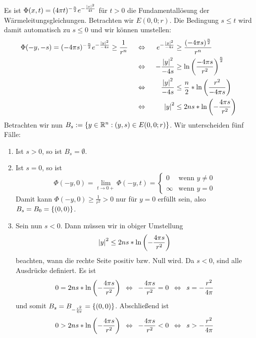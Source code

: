 \begin{exercisePage}
	Es ist $\Phi(x,t) = (4 \pi t)^{-\frac{n}{2}} e^{- \frac{\left| x \right|^2}{4t}}$ für $t>0$ die Fundamentallösung der Wärmeleitungsgleichungen. Betrachten wir $E(0,0;r)$. Die Bedingung $s \le t$ wird damit automatisch zu $s \le 0$ und wir können umstellen:
	\begin{align*}
		\Phi(-y,-s) = (-4 \pi s)^{-\frac{n}{2}} e^{- \frac{\left| y \right|^2}{-4s}} &\ge \frac{1}{r^n} 
		&\enskip \Leftrightarrow \enskip && e^{- \frac{\left| y \right|^2}{-4s}} &\ge \frac{(-4 \pi s)^{\frac{n}{2}}}{r^n} \\
		&&\enskip \Leftrightarrow \enskip && - \frac{\left| y \right|^2}{-4s} &\ge \ln \left(  \frac{-4 \pi s}{r^2}  \right)^{\frac{n}{2}} \\
		&&\enskip \Leftrightarrow \enskip && \frac{\left| y \right|^2}{-4s} &\le \frac{n}{2} * \ln \left(  \frac{r^2}{-4 \pi s} \right) \\
		&&\enskip \Leftrightarrow \enskip && \left| y \right|^2 &\le 2ns * \ln \left( - \frac{4 \pi s}{r^2} \right)
	\end{align*}
	Betrachten wir nun $B_s \mathrel{:=} \left\{ y \in \mathbb{R}^n : (y,s) \in E(0,0;r) \right\}$. Wir unterscheiden fünf Fälle:
	\begin{enumerate}[label=(\roman*), leftmargin=*]
		\item Ist $s > 0$, so ist $B_s = \emptyset$.
		\item Ist $s = 0$, so ist
		\begin{equation*}
			\Phi(-y,0) = \lim_{t \to 0+} \Phi(-y,t) = \begin{cases}
			0 & \text{wenn } y \neq 0 \\
			\infty & \text{wenn } y = 0
			\end{cases}
		\end{equation*} 
		Damit kann $\Phi(-y,0) \ge \frac{1}{r^2} > 0$ nur für $y = 0$ erfüllt sein, also $B_s = B_0 = \left\{ (0,0) \right\}$.
		\item Sein nun $s < 0$. Dann müssen wir in obiger Umstellung 
		\begin{equation*}
			\left| y \right|^2 \le 2ns * \ln \left( - \frac{4 \pi s}{r^2} \right)
		\end{equation*}
		beachten, wann die rechte Seite positiv bzw. Null wird. Da $s < 0$, sind alle Ausdrücke definiert. Es ist
		\begin{equation*}
			0 = 2ns * \ln \left( - \frac{4 \pi s}{r^2} \right) \enskip \Leftrightarrow \enskip - \frac{4 \pi s}{r^2} = 0 \enskip \Leftrightarrow \enskip s = -\frac{r^2}{4\pi}
		\end{equation*}
		und somit $B_s = B_{-\frac{r^2}{4\pi}} = \left\{ (0,0) \right\}$. 
		Abschließend ist 
		\begin{equation*}
			0 > 2ns * \ln \brackets{- \frac{4 \pi s}{r^2}} \equivalent - \frac{4 \pi s}{r^2} < 0 \equivalent s > -\frac{r^2}{4\pi}

\end{equation*}
\end{enumerate}
\end{exercisePage}
